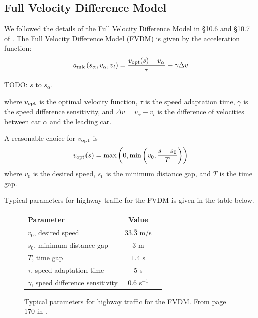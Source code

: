 \documentclass[12pt]{article}
\begin{document}
    \subsection{Full Velocity Difference Model}\label{ch3.1}
    We followed the details of the Full Velocity Difference Model in \S 10.6 and \S 10.7 of \cite{traffic}. The Full Velocity Difference Model (FVDM) is given by the acceleration function: 
    \begin{equation}\label{a_mic}
      a_{\rm mic}(s_\alpha,v_\alpha,v_l) = \frac{v_{\rm opt} (s) - v_\alpha}{\tau} - \gamma \Delta v 
    \end{equation}

    TODO: $s$ to $s_\alpha$.

    where $v_{\rm opt}$ is the optimal velocity function, $\tau$ is the speed adaptation time, $\gamma$ is the speed difference sensitivity, and $\Delta v = v_\alpha - v_l$ is the difference of velocities between car $\alpha$ and the leading car.
    
    A reasonable choice for $v_{\rm opt}$ is 
    \begin{equation} 
      v_{\rm opt} (s) = \max \left( 0, \min \left( v_0, \frac{s-s_0}{T} \right) \right)
    \end{equation}
    where $v_0$ is the desired speed, $s_0$ is the minimum distance gap, and $T$ is the time gap. 

    Typical parameters for highway traffic for the FVDM is given in the table below. 
    \begin{figure}[H]
      \begin{center}
        \begin{tabular}{l c c } 
        Parameter & Value \\
        \hline
        $v_0$, desired speed & $33.\bar{3}$ m/s \\
        $s_0$, minimum distance gap & $3$ m \\
        $T$, time gap & $1.4$ s \\
        $\tau$, speed adaptation time & $5$ s \\
        $\gamma$, speed difference sensitivity & $0.6$ s$^{-1}$ \\
        \end{tabular}
        \end{center}
        \caption{Typical parameters for highway traffic for the FVDM. From page 170 in \cite{traffic}.}
        \label{fig:parameters}
    \end{figure}
    
\end{document}
